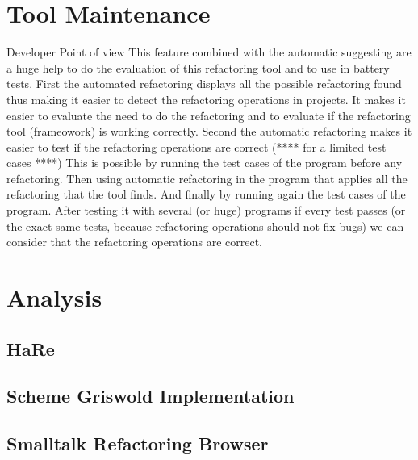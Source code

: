

\section{Tool Maintenance}
Developer Point of view
This feature combined with the automatic suggesting are a huge help to do the
evaluation of this refactoring tool and to use in battery tests.
First the automated refactoring displays all the possible refactoring found thus making it easier
to detect the refactoring operations in projects.
It makes it easier to evaluate the need to do the refactoring and to evaluate
if the refactoring tool (frameowork) is working correctly.
Second the automatic refactoring makes it easier to test if the refactoring operations are correct (**** for a limited test cases ****)
This is possible by running the test cases of the program before any refactoring.
Then using automatic refactoring in the program that applies all the refactoring that the tool finds.
And finally by running again the test cases of the program.
After testing it with several (or huge) programs if every test passes (or the exact same tests, because refactoring operations should not fix bugs)
we can consider that the refactoring operations are correct.


\section{Analysis}
\subsection{HaRe}
\subsection{Scheme Griswold Implementation}
\subsection{Smalltalk Refactoring Browser}
